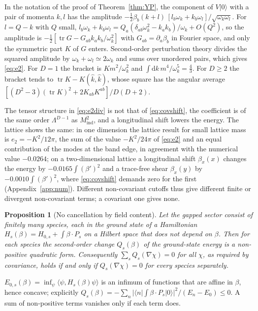 \documentclass[11pt,a4paper]{article}
\makeatletter
\theoremstyle{stmt}
\newtheorem{proposition}[theorem]{Proposition}
\theoremstyle{defn}
\theoremstyle{rmk}
\renewenvironment{proof}[1][\proofname]{\par\pushQED{\qed}\normalfont\topsep6\p@\@plus6\p@\relax
  \trivlist\item[\hskip\labelsep{\sffamily\itshape\small #1.}]\ignorespaces}{\popQED\endtrivlist\@endpefalse}
\numberwithin{equation}{section}
\newcommand{\dd}{\mathrm{d}}
\makeatother
\begin{document}
\begin{proof}
In the notation of the proof of Theorem~\ref{thm:YP}, the component of $V|0\rangle$ with a pair of momenta $k,l$ has the amplitude $-\tfrac12\beta_b(k+l)\,[l_b\omega_k+k_b\omega_l]/\sqrt{\omega_k\omega_l}$. For $l=Q-k$ with $Q$ small, $l_b\omega_k+k_b\omega_l=Q_a(\delta_{ab}\omega_k^2-k_ak_b)/\omega_k+O(Q^2)$, so the amplitude is $-\tfrac12[\operatorname{tr}G-G_{ab}k_ak_b/\omega_k^2]$ with $G_{ab}=\partial_a\beta_b$ in Fourier space, and only the symmetric part $K$ of $G$ enters. Second-order perturbation theory divides the squared amplitude by $\omega_k+\omega_l\simeq2\omega_k$ and sums over unordered pairs, which gives \eqref{eq:e2}. For $D=1$ the bracket is $Km^2/\omega_k^2$ and $\int\dd k\,m^4/\omega_k^5=\tfrac43$. For $D\ge2$ the bracket tends to $\operatorname{tr}K-K(\hat k,\hat k)$, whose square has the angular average $[(D^2-3)(\operatorname{tr}K)^2+2K_{ab}K^{ab}]/D(D+2)$.
\end{proof}

The tensor structure in \eqref{eq:e2div} is not that of \eqref{eq:covshift}, the coefficient is of the same order $\Lambda^{D-1}$ as $M_{\mathrm{ind}}^2$, and a longitudinal shift lowers the energy. The lattice shows the same: in one dimension the lattice result for small lattice mass is $e_2=-K^2/12\pi$, the sum of the value $-K^2/24\pi$ of \eqref{eq:e2} and an equal contribution of the modes at the band edge, in agreement with the numerical value $-0.0264$; on a two-dimensional lattice a longitudinal shift $\beta_x(x)$ changes the energy by $-0.0165\int(\beta')^2$ and a trace-free shear $\beta_x(y)$ by $-0.0010\int(\beta')^2$, where \eqref{eq:covshift} demands zero for the first (Appendix~\ref{app:num}). Different non-covariant cutoffs thus give different finite or divergent non-covariant terms; a covariant one gives none.

\begin{proposition}[No cancellation by field content]\label{prop:nocancel}
Let the gapped sector consist of finitely many species, each in the ground state of a Hamiltonian $H_s(\beta)=H_{0,s}+\int\beta\cdot P_s$ on a Hilbert space that does not depend on $\beta$. Then for each species the second-order change $Q_s(\beta)$ of the ground-state energy is a non-positive quadratic form. Consequently $\sum_sQ_s(\nabla\chi)=0$ for all $\chi$, as required by covariance, holds if and only if $Q_s(\nabla\chi)=0$ for every species separately.
\end{proposition}

\begin{proof}
$E_{0,s}(\beta)=\inf_\psi\langle\psi,H_s(\beta)\psi\rangle$ is an infimum of functions that are affine in $\beta$, hence concave; explicitly $Q_s(\beta)=-\sum_n|\langle n|\int\beta\cdot P_s|0\rangle|^2/(E_n-E_0)\le0$. A sum of non-positive terms vanishes only if each term does.
\end{proof}
\end{document}

